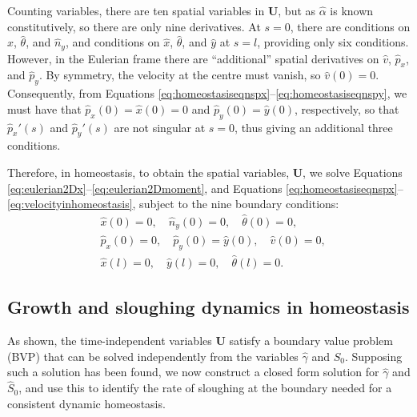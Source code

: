 Counting variables, there are ten spatial variables in $\mathbf{U}$, but as $\hat\alpha$ is known constitutively, so there are only nine derivatives. At $s=0$, there are conditions on $\hat x$, $\hat\theta$, and $\hat n_y$, and conditions on $\hat x$, $\hat\theta$, and $\hat y$ at $s=l$,  providing only six conditions. However, in the Eulerian frame there are ``additional'' spatial derivatives on $\hat v$, $\hat p_x$, and $\hat p_y$. By symmetry, the velocity at the centre must vanish, so $\hat{v}(0) = 0$. Consequently, from Equations \eqref{eq:homeostasiseqnspx}--\eqref{eq:homeostasiseqnspy}, we must have that $\hat{p}_x(0) = \hat{x}(0) = 0$ and $\hat{p}_y(0) = \hat{y}(0)$, respectively, so that $
\hat{p}_x'(s)$ and $\hat{p}_y'(s)$ are not singular at $s = 0$, thus giving an additional three conditions. 

Therefore, in homeostasis, to obtain the spatial variables, $\mathbf{U}$, we solve Equations \eqref{eq:eulerian2Dx}--\eqref{eq:eulerian2Dmoment}, and Equations \eqref{eq:homeostasiseqnspx}--\eqref{eq:velocityinhomeostasis}, subject to the nine boundary conditions:
\begin{align}
&\hat{x}(0) = 0, \quad \hat{n}_y(0) = 0, \quad \hat{\theta}(0) = 0,\nonumber\\
&\hat{p}_x(0) = 0, \quad \hat{p}_y(0) = \hat{y}(0), \quad\hat{v}(0) = 0,\nonumber\\
&\hat{x}(l) = 0, \quad \hat{y}(l) = 0,\quad \hat\theta(l) = 0.\label{eq:homeostasisbcs}
\end{align}

\subsection{Growth and sloughing dynamics in homeostasis}
\label{sec:growthsloughinghomeostasis}
As shown, the time-independent variables $\mathbf{U}$ satisfy a boundary value problem (BVP) that can be solved independently from the variables $\hat\gamma$ and $\hat S_0$. Supposing such a solution has been found, we now construct a closed form solution for $\hat\gamma$ and $\hat S_0$, and use this to identify the rate of sloughing at the boundary needed for a consistent dynamic homeostasis.

